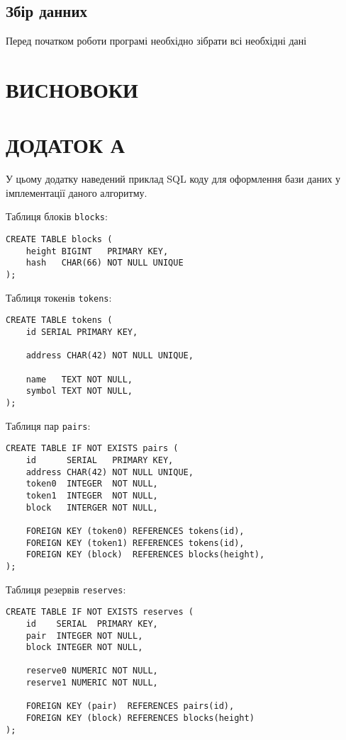 \documentclass[14pt]{extarticle}
\begin{document}
\subsection{Збір данних}

Перед початком роботи програмі необхідно зібрати всі необхідні дані

\newpage

\section{ВИСНОВОКИ}

\newpage

\printbibliography{}
\newpage

\section*{ДОДАТОК А}\label{sec:addition-a}

У цьому додатку наведений приклад SQL коду для оформлення бази даних у
імплементації даного алгоритму.

Таблиця блоків \texttt{blocks}:

\begin{verbatim}
CREATE TABLE blocks (
    height BIGINT   PRIMARY KEY,
    hash   CHAR(66) NOT NULL UNIQUE
);
\end{verbatim}

Таблиця токенів \texttt{tokens}:

\begin{verbatim}
CREATE TABLE tokens (
    id SERIAL PRIMARY KEY,

    address CHAR(42) NOT NULL UNIQUE,

    name   TEXT NOT NULL,
    symbol TEXT NOT NULL,
);
\end{verbatim}

Таблиця пар \texttt{pairs}:

\begin{verbatim}
CREATE TABLE IF NOT EXISTS pairs (
    id      SERIAL   PRIMARY KEY,
    address CHAR(42) NOT NULL UNIQUE,
    token0  INTEGER  NOT NULL,
    token1  INTEGER  NOT NULL,
    block 	INTERGER NOT NULL,

    FOREIGN KEY (token0) REFERENCES tokens(id),
    FOREIGN KEY (token1) REFERENCES tokens(id),
    FOREIGN KEY (block)  REFERENCES blocks(height),
);
\end{verbatim}

Таблиця резервів \texttt{reserves}:

\begin{verbatim}
CREATE TABLE IF NOT EXISTS reserves (
    id    SERIAL  PRIMARY KEY,
    pair  INTEGER NOT NULL,
    block INTEGER NOT NULL,

    reserve0 NUMERIC NOT NULL,
    reserve1 NUMERIC NOT NULL,

    FOREIGN KEY (pair)  REFERENCES pairs(id),
    FOREIGN KEY (block) REFERENCES blocks(height)
);
\end{verbatim}
\end{document}
